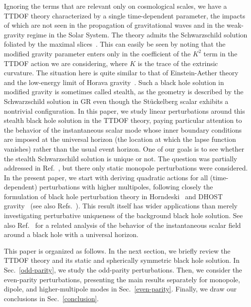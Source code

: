 \documentclass[aps,prd,preprintnumbers,superscriptaddress,nofootinbib,notitlepage]{revtex4-2}
\begin{document}
Ignoring the terms that are relevant only on cosmological scales, we have a TTDOF theory characterized by a single time-dependent parameter, the impacts of which are not seen in the propagation of gravitational waves and in the weak-gravity regime in the Solar System.
The theory admits the Schwarzschild solution foliated by the maximal slices~\cite{Iyonaga:2021yfv}.
This can easily be seen by noting that the modified gravity parameter enters only in the coefficient of the $K^2$ term in the TTDOF action we are considering, where $K$ is the trace of the extrinsic curvature.
The situation here is quite similar to that of Einstein-Aether theory and the low-energy limit of Horava gravity~\cite{Barausse:2011pu,Blas:2011ni}.
Such a black hole solution in modified gravity is sometimes called stealth, as the geometry is described by the Schwarzschild solution in GR even though the St\"{u}ckelberg scalar exhibits a nontrivial configuration.
In this paper, we study linear perturbations around this stealth black hole solution in the TTDOF theory, paying particular attention to the behavior of the instantaneous scalar mode whose inner boundary conditions are imposed at the universal horizon (the location at which the lapse function vanishes) rather than the usual event horizon.
One of our goals is to see whether the stealth Schwarzschild solution is unique or not.
The question was partially addressed in Ref.~\cite{Iyonaga:2021yfv},
but there only static monopole perturbations were considered.
In the present paper, we start with deriving quadratic actions for all (time-dependent) perturbations with higher multipoles, following closely the formulation of black hole perturbation theory in Horndeski~\cite{Kobayashi:2012kh,Kobayashi:2014wsa} and DHOST gravity~\cite{Takahashi:2019oxz,Tomikawa:2021pca,Takahashi:2021bml}
(see also Refs.~\cite{deRham:2019gha,Khoury:2020aya,Langlois:2021aji,Langlois:2022ulw,Nakashi:2022wdg}).
This result itself has wider applications than merely investigating perturbative uniqueness of the background black hole solution.
See also Ref.~\cite{Lin:2017jvc} for a related analysis of the behavior of the instantaneous scalar field around a black hole with a universal horizon.




This paper is organized as follows. In the next section, we briefly review the TTDOF theory and its static and spherically symmetric black hole solution.
In Sec.~\ref{odd-parity}, we study the odd-parity perturbations.
Then, we consider the even-parity perturbations, presenting the main results separately for monopole, dipole, and higher-multipole modes in Sec.~\ref{even-parity}.
Finally, we draw our conclusions in Sec.~\ref{conclusion}.
\end{document}
